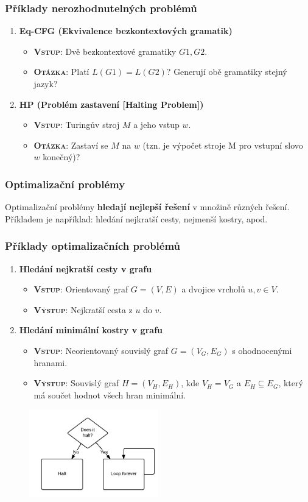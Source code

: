 \subsubsection{Příklady nerozhodnutelných problémů}
\begin{enumerate}
\item \textbf{Eq-CFG (Ekvivalence bezkontextových gramatik)}
\begin{itemize}
\item \textbf{\textsc{Vstup}}: Dvě bezkontextové gramatiky $G1, G2$.
\item \textbf{\textsc{Otázka}}: Platí $L(G1) = L(G2)$? Generují obě gramatiky stejný jazyk?
\end{itemize}
\item \textbf{HP (Problém zastavení [Halting Problem])}
\begin{itemize}
\item \textbf{\textsc{Vstup}}: Turingův stroj $M$ a jeho vstup $w$.
\item \textbf{\textsc{Otázka}}: Zastaví se $M$ na $w$ (tzn. je výpočet stroje M pro vstupní slovo $w$ konečný)?
\end{itemize}
\end{enumerate}

\subsubsection{Optimalizační problémy}
Optimalizační problémy \textbf{hledají nejlepší řešení} v množině různých řešení. Příkladem je například: hledání nejkratší cesty, nejmenší kostry, apod.

\subsubsection{Příklady optimalizačních problémů}
\begin{enumerate}
\item \textbf{Hledání nejkratší cesty v grafu}
\begin{itemize}
	\item \textbf{\textsc{Vstup}}: Orientovaný graf $G = (V, E)$ a dvojice vrcholů $u, v \in V$.
	\item \textbf{\textsc{Výstup}}: Nejkratší cesta z $u$ do $v$.
\end{itemize}
\item \textbf{Hledání minimální kostry v grafu}
\begin{itemize}
\item \textbf{\textsc{Vstup}}: Neorientovaný souvislý graf $G = (V_G,E_G)$ s ohodnocenými hranami. 
\item \textbf{\textsc{Výstup}}: Souvislý graf $H = (V_H,E_H)$, kde $V_H = V_G$ a $E_H \subseteq E_G$, který má součet hodnot všech hran minimální.
\end{itemize}
\end{enumerate}




\begin{figure}[H]
	\centering
	\includegraphics[width=0.5\textwidth]{assets/halting}
\end{figure}